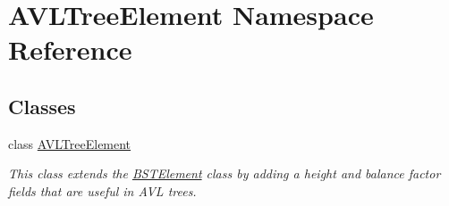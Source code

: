 \hypertarget{namespace_a_v_l_tree_element}{}\section{A\+V\+L\+Tree\+Element Namespace Reference}
\label{namespace_a_v_l_tree_element}
\subsection*{Classes}
\begin{DoxyCompactItemize}
\item 
class \hyperlink{class_a_v_l_tree_element_1_1_a_v_l_tree_element}{A\+V\+L\+Tree\+Element}
\begin{DoxyCompactList}\small\item\em This class extends the \hyperlink{namespace_b_s_t_element}{B\+S\+T\+Element} class by adding a height and balance factor fields that are useful in A\+V\+L trees. \end{DoxyCompactList}\end{DoxyCompactItemize}
